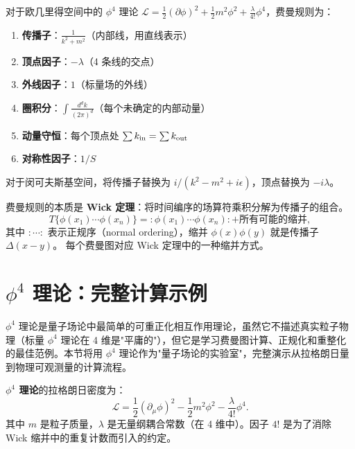 \begin{theorem}
对于欧几里得空间中的 $\phi^4$ 理论 $\mathcal{L} = \frac{1}{2}(\partial\phi)^2 + \frac{1}{2}m^2\phi^2 + \frac{\lambda}{4!}\phi^4$，费曼规则为：
\begin{enumerate}
    \item \textbf{传播子}：$\displaystyle \frac{1}{k^2 + m^2}$\quad（内部线，用直线表示）
    \item \textbf{顶点因子}：$-\lambda$\quad（4 条线的交点）
    \item \textbf{外线因子}：$1$\quad（标量场的外线）
    \item \textbf{圈积分}：$\displaystyle \int \frac{d^d k}{(2\pi)^d}$\quad（每个未确定的内部动量）
    \item \textbf{动量守恒}：每个顶点处 $\sum k_{\rm in} = \sum k_{\rm out}$
    \item \textbf{对称性因子}：$1/S$
\end{enumerate}

对于闵可夫斯基空间，将传播子替换为 $i/(k^2 - m^2 + i\epsilon)$，顶点替换为 $-i\lambda$。
\end{theorem}

\begin{remark}
费曼规则的本质是 \textbf{Wick 定理}：将时间编序的场算符乘积分解为传播子的组合。
\begin{equation}
    T\{\phi(x_1)\cdots\phi(x_n)\} = :\!\phi(x_1)\cdots\phi(x_n)\!: + \text{所有可能的缩并},
\end{equation}
其中 $:\cdots:$ 表示正规序（normal ordering），缩并 $\phi(x)\phi(y)$ 就是传播子 $\Delta(x-y)$。
每个费曼图对应 Wick 定理中的一种缩并方式。
\end{remark}

\section{$\phi^4$ 理论：完整计算示例}

$\phi^4$ 理论是量子场论中最简单的可重正化相互作用理论，虽然它不描述真实粒子物理（标量 $\phi^4$ 理论在 4 维是"平庸的"），但它是学习费曼图计算、正规化和重整化的最佳范例。本节将用 $\phi^4$ 理论作为"量子场论的实验室"，完整演示从拉格朗日量到物理可观测量的计算流程。

\begin{definition}[$\phi^4$ 理论]
\textbf{$\phi^4$ 理论}的拉格朗日密度为：
\begin{equation}
    \mathcal{L} = \frac{1}{2}(\partial_\mu \phi)^2 - \frac{1}{2}m^2 \phi^2 - \frac{\lambda}{4!} \phi^4.
\end{equation}
其中 $m$ 是粒子质量，$\lambda$ 是无量纲耦合常数（在 4 维中）。因子 $4!$ 是为了消除 Wick 缩并中的重复计数而引入的约定。
\end{definition}

